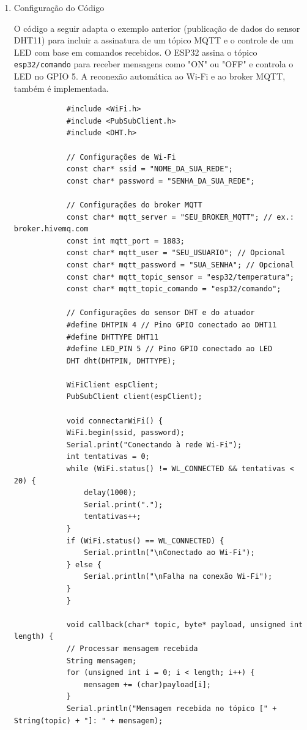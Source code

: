 \documentclass[a4paper]{article}
\begin{document}
\begin{answer}
\begin{enumerate}
            \item{Configuração do Código}

            O código a seguir adapta o exemplo anterior (publicação de dados do sensor DHT11) para incluir a assinatura de um tópico MQTT e o controle de um LED com base em comandos recebidos. O ESP32 assina o tópico \texttt{esp32/comando} para receber mensagens como "ON" ou "OFF" e controla o LED no GPIO 5. A reconexão automática ao Wi-Fi e ao broker MQTT, também é implementada.

            \begin{verbatim}
            #include <WiFi.h>
            #include <PubSubClient.h>
            #include <DHT.h>

            // Configurações de Wi-Fi
            const char* ssid = "NOME_DA_SUA_REDE";
            const char* password = "SENHA_DA_SUA_REDE";

            // Configurações do broker MQTT
            const char* mqtt_server = "SEU_BROKER_MQTT"; // ex.: broker.hivemq.com
            const int mqtt_port = 1883;
            const char* mqtt_user = "SEU_USUARIO"; // Opcional
            const char* mqtt_password = "SUA_SENHA"; // Opcional
            const char* mqtt_topic_sensor = "esp32/temperatura";
            const char* mqtt_topic_comando = "esp32/comando";

            // Configurações do sensor DHT e do atuador
            #define DHTPIN 4 // Pino GPIO conectado ao DHT11
            #define DHTTYPE DHT11
            #define LED_PIN 5 // Pino GPIO conectado ao LED
            DHT dht(DHTPIN, DHTTYPE);

            WiFiClient espClient;
            PubSubClient client(espClient);

            void connectarWiFi() {
            WiFi.begin(ssid, password);
            Serial.print("Conectando à rede Wi-Fi");
            int tentativas = 0;
            while (WiFi.status() != WL_CONNECTED && tentativas < 20) {
                delay(1000);
                Serial.print(".");
                tentativas++;
            }
            if (WiFi.status() == WL_CONNECTED) {
                Serial.println("\nConectado ao Wi-Fi");
            } else {
                Serial.println("\nFalha na conexão Wi-Fi");
            }
            }

            void callback(char* topic, byte* payload, unsigned int length) {
            // Processar mensagem recebida
            String mensagem;
            for (unsigned int i = 0; i < length; i++) {
                mensagem += (char)payload[i];
            }
            Serial.println("Mensagem recebida no tópico [" + String(topic) + "]: " + mensagem);


\end{verbatim}
\end{enumerate}
\end{answer}
\end{document}

